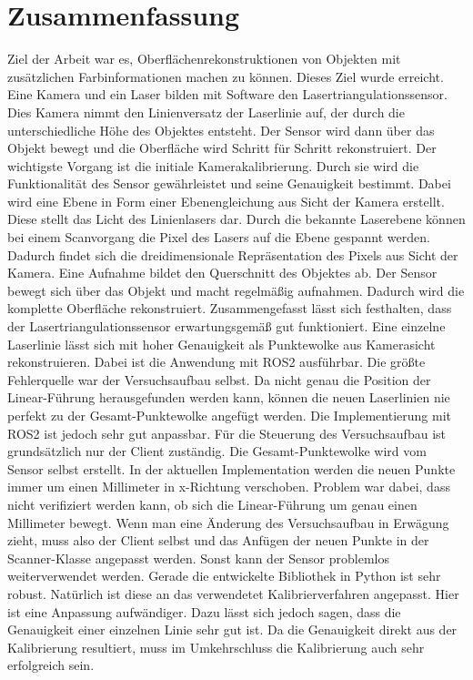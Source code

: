 \section{Zusammenfassung}\label{zusammenfassung}
	Ziel der Arbeit war es, Oberflächenrekonstruktionen von Objekten mit zusätzlichen Farbinformationen machen zu können. Dieses Ziel wurde erreicht. Eine Kamera und ein Laser bilden mit Software den Lasertriangulationssensor. Dies Kamera nimmt den Linienversatz der Laserlinie auf, der durch die unterschiedliche Höhe des Objektes entsteht. Der Sensor wird dann über das Objekt bewegt und die Oberfläche wird Schritt für Schritt rekonstruiert. Der wichtigste Vorgang ist die initiale Kamerakalibrierung. Durch sie wird die Funktionalität des Sensor gewährleistet und seine Genauigkeit bestimmt. Dabei wird eine Ebene in Form einer Ebenengleichung aus Sicht der Kamera erstellt. Diese stellt das Licht des Linienlasers dar. Durch die bekannte Laserebene können bei einem Scanvorgang die Pixel des Lasers auf die Ebene gespannt werden. Dadurch findet sich die dreidimensionale Repräsentation des Pixels aus Sicht der Kamera. Eine Aufnahme bildet den Querschnitt des Objektes ab. Der Sensor bewegt sich über das Objekt und macht regelmäßig aufnahmen. Dadurch wird die komplette Oberfläche rekonstruiert. \newline
	Zusammengefasst lässt sich festhalten, dass der Lasertriangulationssensor erwartungsgemäß gut funktioniert. Eine einzelne Laserlinie lässt sich mit hoher Genauigkeit als Punktewolke aus Kamerasicht rekonstruieren. Dabei ist die Anwendung mit ROS2 ausführbar. Die größte Fehlerquelle war der Versuchsaufbau selbst. Da nicht genau die Position der Linear-Führung herausgefunden werden kann, können die neuen Laserlinien nie perfekt zu der Gesamt-Punktewolke angefügt werden. Die Implementierung mit ROS2 ist jedoch sehr gut anpassbar. Für die Steuerung des Versuchsaufbau ist grundsätzlich nur der Client zuständig. Die Gesamt-Punktewolke wird vom Sensor selbst erstellt. In der aktuellen Implementation werden die neuen Punkte immer um einen Millimeter in x-Richtung verschoben. Problem war dabei, dass nicht verifiziert werden kann, ob sich die Linear-Führung um genau einen Millimeter bewegt. Wenn man eine Änderung des Versuchsaufbau in Erwägung zieht, muss also der Client selbst und das Anfügen der neuen Punkte in der Scanner-Klasse angepasst werden. Sonst kann der Sensor problemlos weiterverwendet werden. Gerade die entwickelte Bibliothek in Python ist sehr robust. Natürlich ist diese an das verwendetet Kalibrierverfahren angepasst. Hier ist eine Anpassung aufwändiger. Dazu lässt sich jedoch sagen, dass die Genauigkeit einer einzelnen Linie sehr gut ist. Da die Genauigkeit direkt aus der Kalibrierung resultiert, muss im Umkehrschluss die Kalibrierung auch sehr erfolgreich sein. \newline
